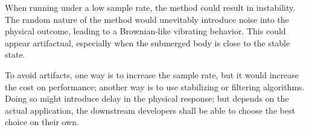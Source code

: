 When running under a low sample rate, the method could result in instability.
The random nature of the method would unevitably introduce noise into the physical outcome, leading to a Brownian-like vibrating behavior.
This could appear artifactual, especially when the submerged body is close to the stable state.

To avoid artifacts, one way is to increase the sample rate, but it would increase the cost on performance;
another way is to use stabilizing or filtering algorithms.
Doing so might introduce delay in the physical response;
but depends on the actual application, the downstream developers shall be able to choose the best choice on their own.

\begin{comment}
\section*{Postscript and Acknowledgement}

This is the first time I have ever written a serious academical article.
It is guaranteed that there will be naive mistakes all over the place.
Please excuse me, thou reader.
If thou hast spotted any mistake, please feel free to contact me at \url{wangnianyi2001@outlook.com}.
My apologies in advance!

Thanks to the team of my graduation project, \emph{Nani Core} (\url{https://github.com/nani-core}).
The idea of this article rose when I was making the water system in the project.
They established the possibilty for this article to happen.
Special thanks to 陈恩晖 (Omnisch) and 张嘉玥 (Limko).
They are two really, really reliable co-workers and good friends of mine.
They have given me the greatest mental and physical support on the project, and an unforgetful memory in my graduation year.
\end{comment}

\begin{comment}
	\section*{Appendix}

	A sample project of the simulation experiment is published at \url{https://github.com/WangNianyi2001/Water-Simulation-2024}.
\end{comment}